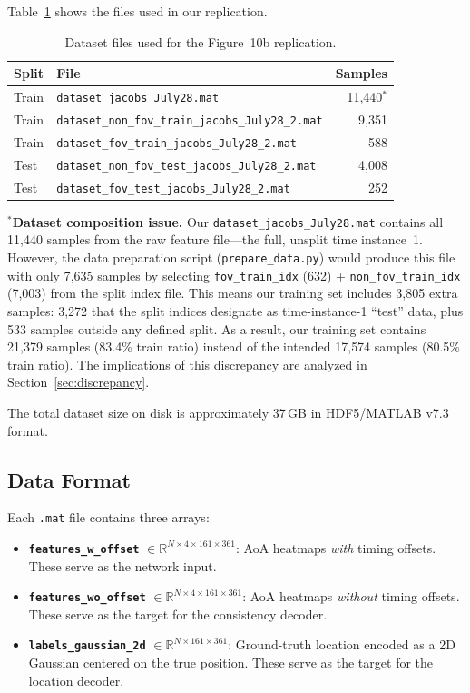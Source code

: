 \documentclass[12pt,a4paper]{article}
\begin{document}
Table~\ref{tab:dataset} shows the files used in our replication.

\begin{table}[H]
\centering
\caption{Dataset files used for the Figure~10b replication.}
\label{tab:dataset}
\begin{tabular}{@{}llr@{}}
\toprule
\textbf{Split} & \textbf{File} & \textbf{Samples} \\
\midrule
Train & \texttt{dataset\_jacobs\_July28.mat} & 11{,}440$^*$ \\
Train & \texttt{dataset\_non\_fov\_train\_jacobs\_July28\_2.mat} & 9{,}351 \\
Train & \texttt{dataset\_fov\_train\_jacobs\_July28\_2.mat} & 588 \\
\midrule
Test  & \texttt{dataset\_non\_fov\_test\_jacobs\_July28\_2.mat} & 4{,}008 \\
Test  & \texttt{dataset\_fov\_test\_jacobs\_July28\_2.mat} & 252 \\
\bottomrule
\end{tabular}
\end{table}

\noindent$^*$\textbf{Dataset composition issue.} Our \texttt{dataset\_jacobs\_July28.mat} contains all 11{,}440 samples from the raw feature file---the full, unsplit time instance~1. However, the data preparation script (\texttt{prepare\_data.py}) would produce this file with only 7{,}635 samples by selecting \texttt{fov\_train\_idx} (632) + \texttt{non\_fov\_train\_idx} (7{,}003) from the split index file. This means our training set includes 3{,}805 extra samples: 3{,}272 that the split indices designate as time-instance-1 ``test'' data, plus 533 samples outside any defined split. As a result, our training set contains 21{,}379 samples (83.4\% train ratio) instead of the intended 17{,}574 samples (80.5\% train ratio). The implications of this discrepancy are analyzed in Section~\ref{sec:discrepancy}.

The total dataset size on disk is approximately 37\,GB in HDF5/MATLAB v7.3 format.

\subsection{Data Format}

Each \texttt{.mat} file contains three arrays:

\begin{itemize}[nosep]
    \item \textbf{\texttt{features\_w\_offset}} $\in \mathbb{R}^{N \times 4 \times 161 \times 361}$: AoA heatmaps \emph{with} timing offsets. These serve as the network input.
    \item \textbf{\texttt{features\_wo\_offset}} $\in \mathbb{R}^{N \times 4 \times 161 \times 361}$: AoA heatmaps \emph{without} timing offsets. These serve as the target for the consistency decoder.
    \item \textbf{\texttt{labels\_gaussian\_2d}} $\in \mathbb{R}^{N \times 161 \times 361}$: Ground-truth location encoded as a 2D Gaussian centered on the true position. These serve as the target for the location decoder.
\end{itemize}
\end{document}
